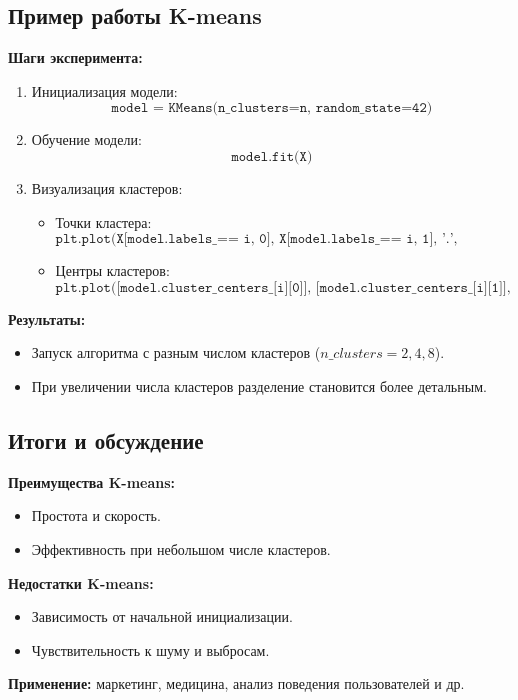 \subsection*{Пример работы K-means}
\textbf{Шаги эксперимента:}
\begin{enumerate}
    \item Инициализация модели:
          \[
              \texttt{model = KMeans(n\_clusters=n, random\_state=42)}
          \]
    \item Обучение модели:
          \[
              \texttt{model.fit(X)}
          \]
    \item Визуализация кластеров:
          \begin{itemize}
              \item Точки кластера:
                    \[
                        \texttt{plt.plot(X[model.labels\_ == i, 0], X[model.labels\_ == i, 1], '.', color=colors[i])}
                    \]
              \item Центры кластеров:
                    \[
                        \texttt{plt.plot([model.cluster\_centers\_[i][0]], [model.cluster\_centers\_[i][1]], 'x', c=colors[i], markersize=20)}
                    \]
          \end{itemize}
\end{enumerate}

\textbf{Результаты:}
\begin{itemize}
    \item Запуск алгоритма с разным числом кластеров ($n\_clusters = 2, 4, 8$).
    \item При увеличении числа кластеров разделение становится более детальным.
\end{itemize}

\subsection*{Итоги и обсуждение}
\textbf{Преимущества K-means:}
\begin{itemize}
    \item Простота и скорость.
    \item Эффективность при небольшом числе кластеров.
\end{itemize}
\textbf{Недостатки K-means:}
\begin{itemize}
    \item Зависимость от начальной инициализации.
    \item Чувствительность к шуму и выбросам.
\end{itemize}
\textbf{Применение:} маркетинг, медицина, анализ поведения пользователей и др.




